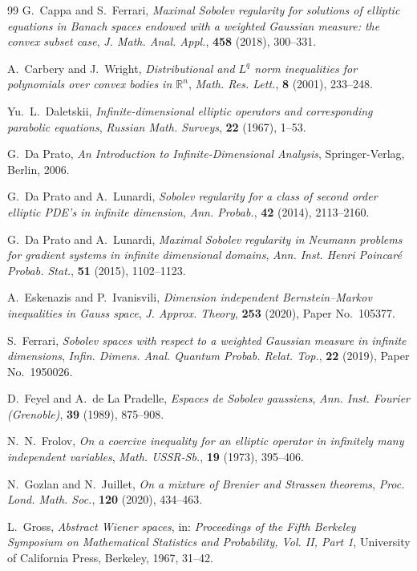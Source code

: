 \documentclass[12pt]{article}
\theoremstyle{plain}
\theoremstyle{definition}
\theoremstyle{remark}
\numberwithin{equation}{section}
\begin{document}
\begin{thebibliography}{99}
G.~Cappa and S.~Ferrari,
\emph{Maximal Sobolev regularity for solutions of elliptic equations
	in Banach spaces endowed with a weighted Gaussian measure:
	the convex subset case},
{\sl J. Math. Anal. Appl.}, \textbf{458} (2018), 300--331.

A.~Carbery and J.~Wright,
\emph{Distributional and $L^q$ norm inequalities for polynomials over
	convex bodies in $\mathbb R^n$},
{\sl Math. Res. Lett.}, \textbf{8} (2001), 233--248.

Yu.~L.~Daletskii,
\emph{Infinite-dimensional elliptic operators and corresponding
	parabolic equations},
{\sl Russian Math. Surveys}, \textbf{22} (1967), 1--53.

G.~Da Prato,
\emph{An Introduction to Infinite-Dimensional Analysis},
Springer-Verlag, Berlin, 2006.

G.~Da Prato and A.~Lunardi,
\emph{Sobolev regularity for a class of second order elliptic PDE's in
	infinite dimension},
{\sl Ann. Probab.}, \textbf{42} (2014), 2113--2160.

G.~Da Prato and A.~Lunardi,
\emph{Maximal Sobolev regularity in Neumann problems for gradient
	systems in infinite dimensional domains},
{\sl Ann. Inst. Henri Poincar\'e Probab. Stat.},
\textbf{51} (2015), 1102--1123.

A.~Eskenazis and P.~Ivanisvili,
\emph{Dimension independent Bernstein--Markov inequalities in Gauss
	space},
{\sl J. Approx. Theory}, \textbf{253} (2020), Paper No.~105377.

S.~Ferrari,
\emph{Sobolev spaces with respect to a weighted Gaussian measure in
	infinite dimensions},
{\sl Infin. Dimens. Anal. Quantum Probab. Relat. Top.},
\textbf{22} (2019), Paper No.~1950026.

D.~Feyel and A.~de La Pradelle,
\emph{Espaces de Sobolev gaussiens},
{\sl Ann. Inst. Fourier (Grenoble)}, \textbf{39} (1989), 875--908.

N.~N.~Frolov,
\emph{On a coercive inequality for an elliptic operator in infinitely
	many independent variables},
{\sl Math. USSR-Sb.}, \textbf{19} (1973), 395--406.

N.~Gozlan and N.~Juillet,
\emph{On a mixture of Brenier and Strassen theorems},
{\sl Proc. Lond. Math. Soc.}, \textbf{120} (2020), 434--463.

L.~Gross,
\emph{Abstract Wiener spaces},
in: \emph{Proceedings of the Fifth Berkeley Symposium on Mathematical
	Statistics and Probability, Vol. II, Part 1},
University of California Press, Berkeley, 1967, 31--42.


\end{thebibliography}
\end{document}

